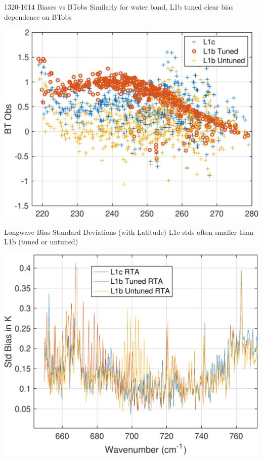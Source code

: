 \documentclass[10pt,t]{beamer}
\begin{document}
\begin{frame}[label={sec:org6447e1f}]{1320-1614 \wn Biases vs BTobs}
Similarly for water band, L1b tuned clear bias dependence on BTobs
\begin{center}
\includegraphics[width=0.75\linewidth]{./bias_vs_btobs_1320-1614.pdf}
\end{center}
\end{frame}
\begin{frame}[label={sec:org9697316}]{Longwave Bias Standard Deviations (with Latitude)}
L1c stds often smaller than L1b (tuned or untuned)
\begin{center}
\includegraphics[width=0.75\linewidth]{./std_3rta_lw.pdf}
\end{center}
\end{frame}
\end{document}
